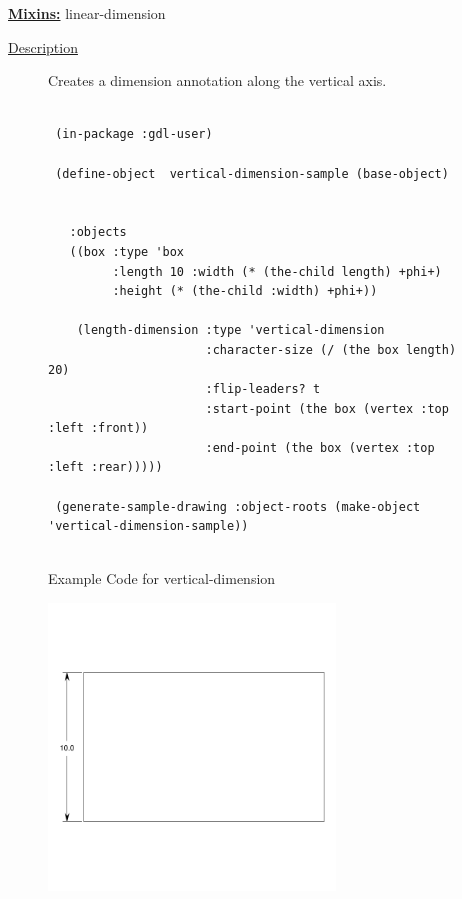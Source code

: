 \documentclass [11pt]{book}
\begin{document}
\begin{itemize}
\textbf{
\underline{Mixins:}} linear-dimension





\begin{description}

\item [
\underline{Description}]


Creates a dimension annotation along the vertical axis.



\end{description}




\begin{figure}
\begin{lrbox}{\boxedverb}
\begin{minipage}{\linewidth}
{\small

\begin{verbatim}        

 (in-package :gdl-user)
                   
 (define-object  vertical-dimension-sample (base-object)
  
  
   :objects
   ((box :type 'box
         :length 10 :width (* (the-child length) +phi+)
         :height (* (the-child :width) +phi+))
   
    (length-dimension :type 'vertical-dimension
                      :character-size (/ (the box length) 20)
                      :flip-leaders? t
                      :start-point (the box (vertex :top :left :front))
                      :end-point (the box (vertex :top :left :rear)))))

 (generate-sample-drawing :object-roots (make-object 'vertical-dimension-sample))


\end{verbatim}}
\end{minipage}
\end{lrbox}
\fbox{\usebox{\boxedverb}}

\caption{Example Code for vertical-dimension}

\label{fig:example-code-vertical-dimension}

\end{figure}

\begin{figure}
\begin{center}
\includegraphics[width=3in,height=3in]{../images/example-vertical-dimension.pdf}
\end{center}


\end{figure}
\end{itemize}
\end{document}
